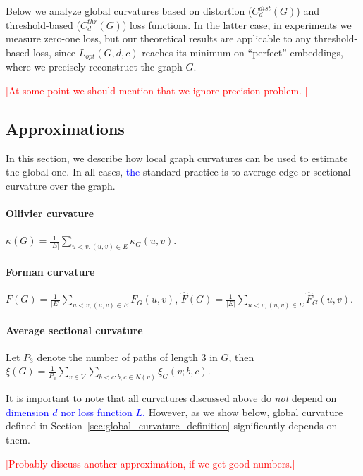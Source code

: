 \documentclass{article} %
\newcommand{\ph}[1]{\textcolor{blue}{#1}}
\begin{document}
Below we analyze global curvatures based on distortion ($C_d^{dist}(G)$) and threshold-based ($C_d^{thr}(G)$) loss functions. 
In the latter case, in experiments we measure zero-one loss, but our theoretical results are applicable to any threshold-based loss, since 
$L_{opt}(G,d,c)$ reaches its minimum on ``perfect'' embeddings, where we precisely reconstruct the graph $G$.

\textcolor{red}{[At some point we should mention that we ignore precision problem. ]}

\subsection{Approximations}

In this section, we describe how local graph curvatures can be used to estimate the global one. In all cases, \ph{the} standard practice is to average edge or sectional curvature over the graph.

\paragraph{Ollivier curvature} $\kappa(G) = \frac{1}{|E|}\sum\limits_{u < v, (u,v) \in E} \kappa_G(u,v)$.

\paragraph{Forman curvature} $F(G) = \frac{1}{|E|}\sum\limits_{u < v, (u,v) \in E} F_G(u,v)$, $\hat F(G) = \frac{1}{|E|}\sum\limits_{u < v, (u,v) \in E} \hat F_G(u,v)$.

\paragraph{Average sectional curvature} Let $P_3$ denote the number of paths of length 3 in $G$, then $\xi(G) = \frac{1}{P_3} \sum\limits_{v \in V }\sum\limits_{b<c: b,c\in N(v)} \xi_G(v;b,c)$.

It is important to note that all curvatures discussed above do \textit{not} depend on \ph{dimension $d$ nor loss function $L$.} However, as we show below, global curvature defined in Section~\ref{sec:global_curvature_definition} significantly depends on them.

\textcolor{red}{[Probably discuss another approximation, if we get good numbers.]}
\end{document}
